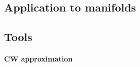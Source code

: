 \documentclass[11pt]{article}
\theoremstyle{definition}
\theoremstyle{plain}
\newcommand{\1}{\mathbf{1}}
\begin{document}
\subsection{Application to manifolds}

\subsection{Tools}

\paragraph{CW approximation}
\end{document}
